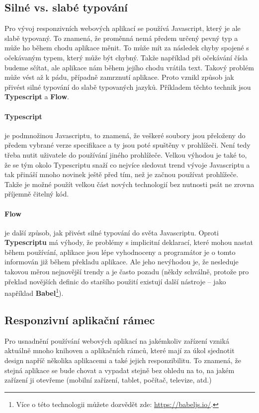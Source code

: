 \subsection{Silné vs. slabé typování}
\par Pro vývoj responzivních webových aplikací se používá Javascript, který je ale slabě typovaný. To znamená, že proměnná nemá předem určený pevný typ a může ho během chodu aplikace měnit. To může mít za následek chyby spojené s očekávaným typem, který může být chybný. Takže například při očekávání čísla budeme sčítat, ale aplikace nám během jejího chodu vrátila text. Takový problém může vést až k pádu, případně zamrznutí aplikace. Proto vznikl způsob jak přivést silné typování do slabě typovaných jazyků. Příkladem těchto technik jsou \textbf{Typescript} a \textbf{Flow}.

\paragraph{Typescript} je podmnožinou Javascriptu, to znamená, že veškeré soubory jsou přeloženy do předem vybrané verze specifikace a ty jsou poté spuštěny v prohlížeči. Není tedy třeba nutit uživatele do používání jiného prohlížeče. Velkou výhodou je také to, že se tým okolo Typescriptu snaží co nejvíce sledovat trend vývoje Javascriptu a tak přináší mnoho novinek ještě před tím, než je začnou používat prohlížeče. Takže je možné použít velkou část nových technologií bez nutnosti psát ne zrovna příjemně čitelný kód.

\paragraph{Flow} je další způsob, jak přivést silné typování do světa Javascriptu. Oproti \textbf{Typescriptu} má výhody, že problémy s implicitní deklarací, které mohou nastat během používání, aplikace jsou lépe vyhodnoceny a programátor je o tomto informován již během překladu aplikace. Ale jeho nevýhodou je, že nesleduje takovou měrou nejnovější trendy a je často pozadu (někdy schválně, protože pro překlad novějších definic do staršího použití existují další nástroje -- jako například \textbf{Babel}\footnote{Více o této technologii můžete dozvědět zde: \url{https://babeljs.io/}.}).

\subsection{Responzivní aplikační rámec}
\par Pro usnadnění používání webových aplikací na jakémkoliv zařízení vzniká aktuálně mnoho knihoven a aplikačních rámců, které mají za úkol sjednotit design napříč několika aplikacemi a také jejich responzibilitu. To znamená, že stejná aplikace se bude chovat a vypadat stejně bez ohledu na to, na jakém zařízení ji otevřeme (mobilní zařízení, tablet, počítač, televize, atd.)

